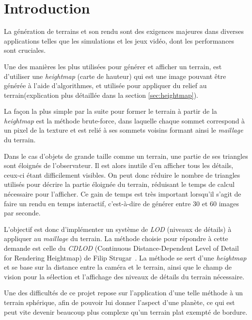   \chapter*{Introduction}
  \setcounter{chapter}{0}
  
  La génération de terrains et son rendu sont des exigences majeures dans diverses applications telles que les simulations et les jeux vidéo, dont les performances sont cruciales.
  
  Une des manières les plus utilisées pour générer et afficher un terrain, est d'utiliser une \emph{heightmap} (carte de hauteur) qui est une image pouvant être générée à l'aide d'algorithmes, et utilisée pour appliquer du relief au terrain(explication plus détaillée dans la section \ref{sec:heightmap}).
  
  La façon la plus simple par la suite pour former le terrain à partir de la \emph{heightmap} est la méthode brute-force, dans laquelle chaque sommet correspond à un pixel de la texture et est relié à ses sommets voisins formant ainsi le \emph{maillage} du terrain.
  
  Dans le cas d'objets de grande taille comme un terrain, une partie de
  ses triangles sont éloignés de l'observateur. Il est alors inutile d'en
  afficher tous les détails, ceux-ci étant difficilement visibles. On peut
  donc réduire le nombre de triangles utilisés pour décrire la partie
  éloignée du terrain, réduisant le temps de calcul nécessaire pour
  l'afficher. Ce gain de temps est très important lorsqu'il s'agit de
  faire un rendu en temps interactif, c'est-à-dire de générer entre 30 et
  60 images par seconde.
  
  L'objectif est donc d'implémenter un système de \emph{LOD} (niveaux de détails) à appliquer au \emph{maillage} du terrain. La méthode choisie pour répondre à cette demande est celle du \emph{CDLOD} (Continuous Distance-Dependent Level of Detail for Rendering Heightmap) de Filip Strugar~\cite{CDLOD}. La méthode se sert d'une \emph{heightmap} et se base sur la distance entre la caméra et le terrain, ainsi que le champ de vision pour la sélection et l'affichage des niveaux de détails du terrain nécessaire.
  
  Une des difficultés de ce projet repose sur l'application d'une telle méthode à un terrain sphérique, afin de pouvoir lui donner l'aspect d'une planète, ce qui est peut vite devenir beaucoup plus complexe qu'un terrain plat exempté de bordure.
  